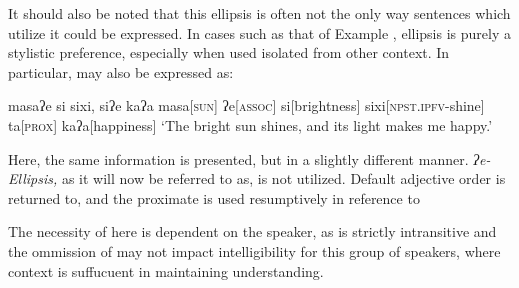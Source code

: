 It should also be noted that this ellipsis is often not the only way sentences which utilize it could be expressed.
In cases such as that of Example , ellipsis is purely a stylistic preference, especially when used isolated from other context.
In particular,  may also be expressed as:

\ex
\begingl
\glpreamble masaʔe si sixi, siʔe kaʔa
\endpreamble
\nogloss{\lbrack}
masa[\textsc{sun}]
ʔe[\textsc{assoc}]
si[brightness]
\nogloss{\rbrack}
sixi[\textsc{npst.ipfv}-shine]
ta[\textsc{prox}]
kaʔa[happiness]
\glft `The bright sun shines, and its light makes me happy.'
\endgl
\xe

Here, the same information is presented, but in a slightly different manner.
\textit{ʔe-Ellipsis,} as it will now be referred to as, is not utilized.
Default adjective order is returned to, and the proximate  is used resumptively in reference to 

The necessity of  here is dependent on the speaker, as  is strictly intransitive and the ommission of  may not impact intelligibility for this group of speakers, where context is suffucuent in maintaining understanding.
